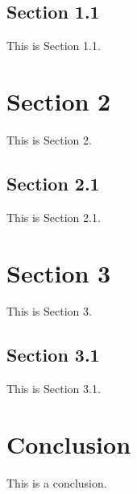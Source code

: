 \documentclass[letterpaper,12pt]{article}
\begin{document}



\subsection{Section 1.1}
This is Section 1.1.

\section{Section 2}
This is Section 2.

\subsection{Section 2.1}
This is Section 2.1.

\section{Section 3}
This is Section 3.

\subsection{Section 3.1}
This is Section 3.1.

\section{Conclusion}
This is a conclusion.





\vspace{.25in}
\end{document}
